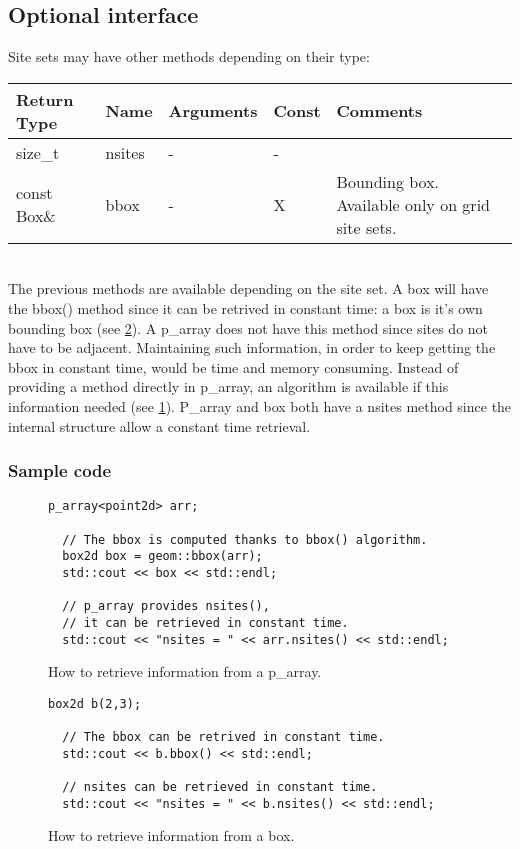 \documentclass{report}
\begin{document}
\subsection{Optional interface}
Site sets may have other methods depending on their type: \\

\begin{tabular}{|l|l|l|l|p{4cm}|}
\hline
Return Type & Name & Arguments & Const & Comments \\ \hline

size\_t & nsites & - & - & \\ \hline
const Box\& & bbox & - & X &  Bounding box. Available only on grid site sets.
\\ \hline
\end{tabular} \\

The previous methods are available depending on the site set. A box
will have the bbox() method since it can be retrived in constant time: a box
is it's own bounding box (see \ref{fig:box_bbox}). A p\_array does not have this
method since sites do not have to be adjacent. Maintaining such information, in
order to keep getting the bbox in constant time, would be time and memory
consuming. Instead of providing a method directly in p\_array, an algorithm is
available if this information needed (see \ref{fig:parray_bbox}).
P\_array and box both have a nsites method since the internal structure allow a
constant time retrieval.

\subsubsection*{Sample code}

\begin{figure}[ht!]
  \begin{lstlisting}[frame=single]
  p_array<point2d> arr;

  // The bbox is computed thanks to bbox() algorithm.
  box2d box = geom::bbox(arr);
  std::cout << box << std::endl;

  // p_array provides nsites(),
  // it can be retrieved in constant time.
  std::cout << "nsites = " << arr.nsites() << std::endl;
  \end{lstlisting}
  \caption{How to retrieve information from a p\_array.\label{fig:parray_bbox}}
\end{figure}

\begin{figure}[ht!]
  \begin{lstlisting}[frame=single]
  box2d b(2,3);

  // The bbox can be retrived in constant time.
  std::cout << b.bbox() << std::endl;

  // nsites can be retrieved in constant time.
  std::cout << "nsites = " << b.nsites() << std::endl;
  \end{lstlisting}
  \caption{How to retrieve information from a box.\label{fig:box_bbox}}
\end{figure}
\end{document}
